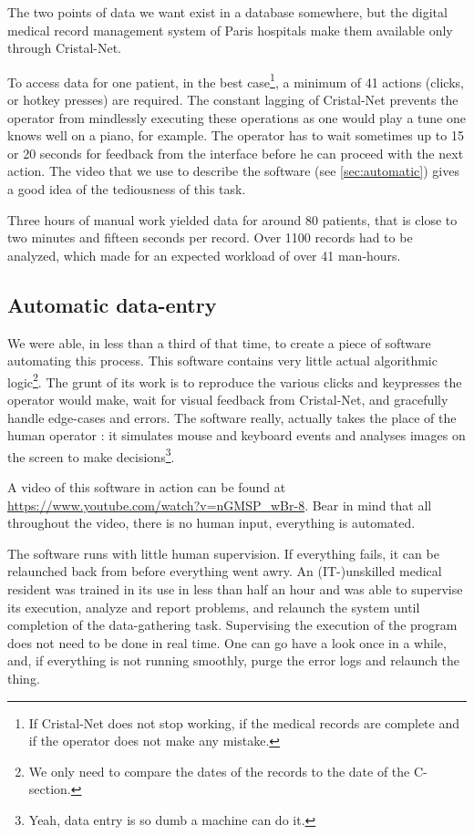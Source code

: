 \documentclass[nobib]{tufte-handout}
\begin{document}
The two points of data we want exist in a database somewhere, but the digital medical record management system of Paris hospitals make them available only through Cristal-Net.

To access data for one patient, in the best case\footnote{If Cristal-Net does not stop working, if the medical records are complete and if the operator does not make any mistake.}, a minimum of 41 actions (clicks, or hotkey presses) are required. The constant lagging of Cristal-Net prevents the operator from mindlessly executing these operations as one would play a tune one knows well on a piano, for example. The operator has to wait sometimes up to 15 or 20 seconds for feedback from the interface before he can proceed with the next action. The video that we use to describe the software (see \autoref{sec:automatic}) gives a good idea of the tediousness of this task.

Three hours of manual work yielded data for around 80 patients, that is close to two minutes and fifteen seconds per record. Over 1100 records had to be analyzed, which made for an expected workload of over 41 man-hours. 

\subsection{Automatic data-entry}
\label{sec:automatic}

We were able, in less than a third of that time, to create a piece of software automating this process. This software contains very little actual algorithmic logic\footnote{We only need to compare the dates of the records to the date of the C-section.}. The grunt of its work is to reproduce the various clicks and keypresses the operator would make, wait for visual feedback from Cristal-Net, and gracefully handle edge-cases and errors. The software really, actually takes the place of the human operator : it simulates mouse and keyboard events and analyses images on the screen to make decisions\footnote{Yeah, data entry is so dumb a machine can do it.}.

A video of this software in action can be found at \url{https://www.youtube.com/watch?v=nGMSP_wBr-8}. Bear in mind that all throughout the video, there is no human input, everything is automated.

The software runs with little human supervision. If everything fails, it can be relaunched back from before everything went awry. An (IT-)unskilled medical resident was trained in its use in less than half an hour and was able to supervise its execution, analyze and report problems, and relaunch the system until completion of the data-gathering task. Supervising the execution of the program does not need to be done in real time. One can go have a look once in a while, and, if everything is not running smoothly, purge the error logs and relaunch the thing.
\end{document}
